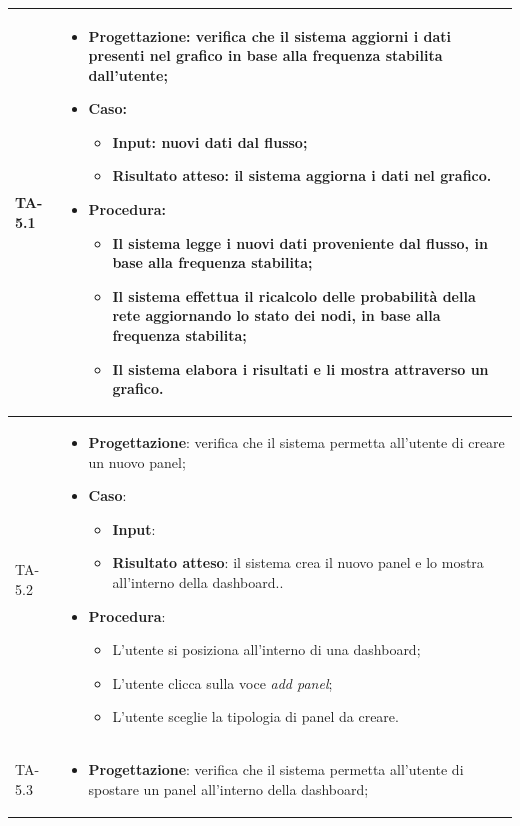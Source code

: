 \begin{longtable}{|C{2.5cm}|C{13cm}|}
{TA-5.1} &
\begin{itemize}
	\item \textbf{Progettazione}: verifica che il sistema aggiorni i dati presenti nel grafico in base alla frequenza stabilita dall'utente;
	\item \textbf{Caso}: 
	\begin{itemize}
		\item \textbf{Input}: nuovi dati dal flusso;
		\item \textbf{Risultato atteso}: il sistema aggiorna i dati nel grafico.
	\end{itemize}
	\item \textbf{Procedura}:
	\begin{itemize}
		\item Il sistema legge i nuovi dati proveniente dal flusso, in base alla frequenza stabilita;
		\item Il sistema effettua il ricalcolo delle probabilità della rete aggiornando lo stato dei nodi, in base alla frequenza stabilita;
		\item Il sistema elabora i risultati e li mostra attraverso un grafico.
	\end{itemize} 
\end{itemize} \\
\hline
{TA-5.2} &
\begin{itemize}
	\item \textbf{Progettazione}: verifica che il sistema permetta all'utente di creare un nuovo panel;
	\item \textbf{Caso}: 
	\begin{itemize}
		\item \textbf{Input}:
		\item \textbf{Risultato atteso}: il sistema crea il nuovo panel e lo mostra all'interno della dashboard..
	\end{itemize}
	\item \textbf{Procedura}:
	\begin{itemize}
		\item L'utente si posiziona all'interno di una dashboard;
		\item L'utente clicca sulla voce \emph{add panel};
		\item L'utente sceglie la tipologia di panel da creare.
	\end{itemize} 
\end{itemize} \\
\hline
{TA-5.3} &
\begin{itemize}
	\item \textbf{Progettazione}: verifica che il sistema permetta all'utente di spostare un panel all'interno della dashboard;

\end{itemize}
\end{longtable}
